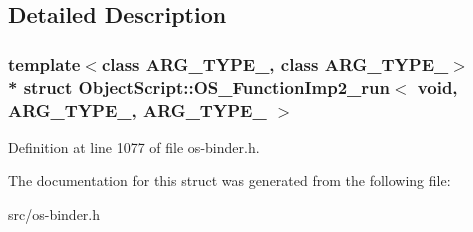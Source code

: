 \subsection{Detailed Description}
\subsubsection*{template$<$class A\+R\+G\+\_\+\+T\+Y\+P\+E\+\_, class A\+R\+G\+\_\+\+T\+Y\+P\+E\+\_$>$\\*
struct Object\+Script\+::\+O\+S\+\_\+\+Function\+Imp2\+\_\+run$<$ void,   A\+R\+G\+\_\+\+T\+Y\+P\+E\+\_, A\+R\+G\+\_\+\+T\+Y\+P\+E\+\_ $>$}



Definition at line 1077 of file os-\/binder.\+h.



The documentation for this struct was generated from the following file\+:\begin{DoxyCompactItemize}
\item 
src/os-\/binder.\+h\end{DoxyCompactItemize}
